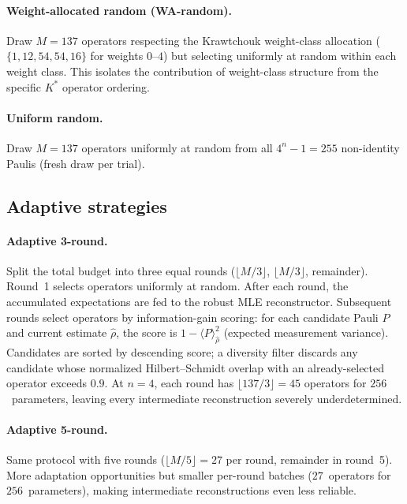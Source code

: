 \documentclass[twocolumn,prx,aps,superscriptaddress,longbibliography]{revtex4-2}
\begin{document}
\paragraph{Weight-allocated random (WA-random).}
Draw $M = 137$ operators respecting the Krawtchouk weight-class
allocation ($\{1, 12, 54, 54, 16\}$ for weights $0$--$4$) but
selecting uniformly at random within each weight class.  This
isolates the contribution of weight-class structure from the
specific $K^*$ operator ordering.

\paragraph{Uniform random.}
Draw $M = 137$ operators uniformly at random from all $4^n - 1 = 255$
non-identity Paulis (fresh draw per trial).

\subsection{Adaptive strategies}

\paragraph{Adaptive 3-round.}
Split the total budget into three equal rounds ($\lfloor M/3 \rfloor$,
$\lfloor M/3 \rfloor$, remainder).  Round~1 selects operators
uniformly at random.  After each round, the accumulated expectations
are fed to the robust MLE reconstructor.  Subsequent rounds select
operators by information-gain scoring: for each candidate Pauli $P$
and current estimate $\hat\rho$, the score is
$1 - \langle P \rangle_{\hat\rho}^2$
(expected measurement variance).  Candidates are sorted by
descending score; a diversity filter discards any candidate whose
normalized Hilbert--Schmidt overlap with an already-selected operator
exceeds $0.9$.  At $n = 4$, each round has
$\lfloor 137 / 3 \rfloor = 45$ operators for $256$~parameters,
leaving every intermediate reconstruction severely underdetermined.

\paragraph{Adaptive 5-round.}
Same protocol with five rounds ($\lfloor M/5 \rfloor = 27$ per round,
remainder in round~5).  More adaptation opportunities but smaller
per-round batches ($27$~operators for $256$~parameters), making
intermediate reconstructions even less reliable.
\end{document}
